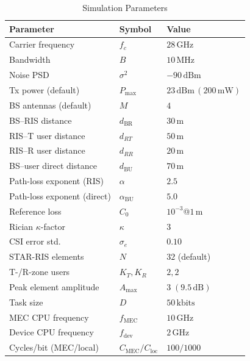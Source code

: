 \documentclass[journal]{IEEEtran}
\begin{document}
\begin{table}[t]
\centering
\caption{Simulation Parameters}
\label{tab:params}
\begin{tabular}{lll}
\toprule
\textbf{Parameter} & \textbf{Symbol} & \textbf{Value} \\
\midrule
Carrier frequency          & $f_c$                 & $28\,\text{GHz}$ \\
Bandwidth                  & $B$                   & $10\,\text{MHz}$ \\
Noise PSD                  & $\sigma^2$            & $-90\,\text{dBm}$ \\
Tx power (default)         & $P_{\max}$            & $23\,\text{dBm}\,(200\,\text{mW})$ \\
BS antennas (default)      & $M$                   & $4$ \\
BS--RIS distance           & $d_{\mathrm{BR}}$     & $30\,\text{m}$ \\
RIS--T user distance       & $d_{RT}$              & $50\,\text{m}$ \\
RIS--R user distance       & $d_{RR}$              & $20\,\text{m}$ \\
BS--user direct distance   & $d_{\mathrm{BU}}$     & $70\,\text{m}$ \\
Path-loss exponent (RIS)   & $\alpha$              & $2.5$ \\
Path-loss exponent (direct)& $\alpha_{\mathrm{BU}}$& $5.0$ \\
Reference loss             & $C_0$                 & $10^{-3}$@$1\,\text{m}$ \\
Rician $\kappa$-factor     & $\kappa$              & $3$ \\
CSI error std.             & $\sigma_e$            & $0.10$ \\
STAR-RIS elements          & $N$                   & $32$ (default) \\
T-/R-zone users            & $K_T,K_R$             & $2,2$ \\
Peak element amplitude     & $A_{\max}$            & $3\;(9.5\,\text{dB})$ \\
Task size                  & $D$                   & $50\,\text{kbits}$ \\
MEC CPU frequency          & $f_{\mathrm{MEC}}$    & $10\,\text{GHz}$ \\
Device CPU frequency       & $f_{\mathrm{dev}}$    & $2\,\text{GHz}$ \\
Cycles/bit (MEC/local)     & $C_{\mathrm{MEC}}/C_{\mathrm{loc}}$ & $100/1000$ \\

\end{tabular}
\end{table}
\end{document}
